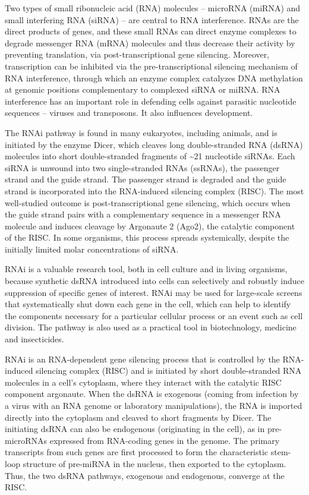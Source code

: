 Two types of small ribonucleic acid (RNA) molecules -- microRNA (miRNA) and small interfering RNA (siRNA) -- are central to RNA interference. RNAs are the direct products of genes, and these small RNAs can direct enzyme complexes to degrade messenger RNA (mRNA) molecules and thus decrease their activity by preventing translation, via post-transcriptional gene silencing. Moreover, transcription can be inhibited via the pre-transcriptional silencing mechanism of RNA interference, through which an enzyme complex catalyzes DNA methylation at genomic positions complementary to complexed siRNA or miRNA. RNA interference has an important role in defending cells against parasitic nucleotide sequences -- viruses and transposons. It also influences development.

The RNAi pathway is found in many eukaryotes, including animals, and is initiated by the enzyme Dicer, which cleaves long double-stranded RNA (dsRNA) molecules into short double-stranded fragments of \textasciitilde{}21 nucleotide siRNAs. Each siRNA is unwound into two single-stranded RNAs (ssRNAs), the passenger strand and the guide strand. The passenger strand is degraded and the guide strand is incorporated into the RNA-induced silencing complex (RISC). The most well-studied outcome is post-transcriptional gene silencing, which occurs when the guide strand pairs with a complementary sequence in a messenger RNA molecule and induces cleavage by Argonaute 2 (Ago2), the catalytic component of the RISC. In some organisms, this process spreads systemically, despite the initially limited molar concentrations of siRNA.

RNAi is a valuable research tool, both in cell culture and in living organisms, because synthetic dsRNA introduced into cells can selectively and robustly induce suppression of specific genes of interest. RNAi may be used for large-scale screens that systematically shut down each gene in the cell, which can help to identify the components necessary for a particular cellular process or an event such as cell division. The pathway is also used as a practical tool in biotechnology, medicine and insecticides.

RNAi is an RNA-dependent gene silencing process that is controlled by the RNA-induced silencing complex (RISC) and is initiated by short double-stranded RNA molecules in a cell's cytoplasm, where they interact with the catalytic RISC component argonaute. When the dsRNA is exogenous (coming from infection by a virus with an RNA genome or laboratory manipulations), the RNA is imported directly into the cytoplasm and cleaved to short fragments by Dicer. The initiating dsRNA can also be endogenous (originating in the cell), as in pre-microRNAs expressed from RNA-coding genes in the genome. The primary transcripts from such genes are first processed to form the characteristic stem-loop structure of pre-miRNA in the nucleus, then exported to the cytoplasm. Thus, the two dsRNA pathways, exogenous and endogenous, converge at the RISC.

